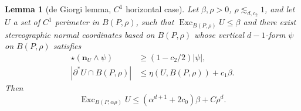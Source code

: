 \documentclass[reqno,10pt]{amsart}
\DeclareMathOperator{\Exc}{Exc}
\newcommand{\normal}{\mathbf n}
\newtheorem{lemma}[theorem]{Lemma}
\theoremstyle{definition}
\numberwithin{equation}{section}
\begin{document}
\begin{lemma}[de Giorgi lemma, $C^1$ horizontal case]\label{Miranda44}
Let $\beta, \rho > 0$, $\rho \lesssim_{d, c_2} 1$, and let $U$ a set of $C^1$ perimeter in $B(P, \rho)$, such that $\Exc_{B(P, \rho)} U \leq \beta$ and there exist stereographic normal coordinates based on $B(P, \rho)$ whose vertical $d-1$-form $\psi$ on $B(P, \rho)$ satisfies
\begin{align}
\star(\normal_U \wedge \psi) &\geq (1 - c_2/2) |\psi|, \label{Miranda44 normal hyp} \\
|\partial^* U \cap B(P, \rho)| &\leq \eta(U, B(P, \rho)) + c_1 \beta. \label{Miranda44 minimality hyp}
\end{align}
Then
\begin{equation}\label{Miranda44 concl}
\Exc_{B(P, \alpha \rho)} U \leq (\alpha^{d + 1} + 2c_0) \beta + C\rho^d.
\end{equation}
\end{lemma}
\end{document}
